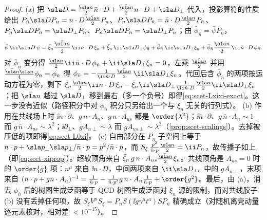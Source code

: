 \begin{proof}
(a) 把 $\sla D=\frac{\sla n}{2}\bar n\cdot D+\frac{\bar{\sla n}}{2}n\cdot D+\sla D_\perp$ 代入，投影算符的性质给出 $P_{\bar n}\sla DP_n=n\cdot D\frac{\bar{\sla n}}{2}P_n$、$P_n\sla DP_{\bar n}=\bar n\cdot D\frac{\sla n}{2}P_{\bar n}$、$P_{\bar n}\sla DP_{\bar n}=\sla D_\perp P_{\bar n}$、$P_n\sla DP_n=\sla D_\perp P_n$；由 $\bar\phi_{\bar n}=\bar\psi P_n$，
\begin{equation}\label{eq:scet-psiDpsi}
\bar\psi\,\ii\sla D\,\psi=\bar\xi_n\frac{\bar{\sla n}}{2}\,\ii n\cdot D\,\xi_n+\bar\xi_n\,\ii\sla D_\perp\phi_{\bar n}
+\bar\phi_{\bar n}\,\ii\sla D_\perp\xi_n+\bar\phi_{\bar n}\frac{\sla n}{2}\,\ii\bar n\cdot D\,\phi_{\bar n}.
\end{equation}
对 $\bar\phi_{\bar n}$ 变分得 $\frac{\sla n}{2}\ii\bar n\cdot D\,\phi_{\bar n}+\ii\sla D_\perp\xi_n=0$，左乘 $\frac{\bar{\sla n}}{2}$ 并用 $\frac{\bar{\sla n}\sla n}{4}\phi_{\bar n}=\phi_{\bar n}$ 得 $\phi_{\bar n}=-\frac{1}{\ii\bar n\cdot D}\frac{\bar{\sla n}}{2}\,\ii\sla D_\perp\xi_n$。代回后含 $\bar\phi_{\bar n}$ 的两项按运动方程为零，剩下 $\bar\xi_n\frac{\bar{\sla n}}2\ii n\cdot D\,\xi_n-\bar\xi_n\ii\sla D_\perp\frac{1}{\ii\bar n\cdot D}\frac{\bar{\sla n}}{2}\ii\sla D_\perp\xi_n$；把 $\bar{\sla n}$ 越过 $\sla D_\perp$ 移到最右（多一个负号）即得\cref{eq:scet-Lxixi-exact}。这一步没有近似（路径积分中对 $\phi_{\bar n}$ 积分只另给出一个与 $\xi_n$ 无关的行列式）。
(b) 作用在共线场上时 $\ii n\cdot\partial$、$g\,n\cdot A_n$、$g\,n\cdot A_{us}$ 都是 $\order{\lambda^2}$；$\ii\bar n\cdot\partial$、$g\,\bar n\cdot A_n\sim1$ 而 $g\,\bar n\cdot A_{us}\sim\lambda^2$；$\ii\partial_\perp$、$gA_{n\perp}\sim\lambda$ 而 $gA_{us\perp}\sim\lambda^2$（\cref{prop:scet-scalings}）。去掉被压低的项即得\cref{eq:scet-L0xi}。
(c) 自由部分在 $P_n$ 子空间上等于 $n\cdot p+\sla p_\perp\sla p_\perp/\bar n\cdot p=p^2/\bar n\cdot p$，而 $S_\xi\,\frac{p^2}{\bar n\cdot p}\frac{\bar{\sla n}}{2}=\ii P_n$，故传播子如上（即\cref{eq:scet-xiprop}）。超软顶角来自 $\bar\xi_n\,g\,n\cdot A_{us}\frac{\bar{\sla n}}2\xi_n$。共线顶角是 $A_{us}=0$ 时的 $\order{g}$ 项：$n^\mu$ 来自 $\ii n\cdot D$，中间两项来自 $\ii\sla D_{\perp c}$ 中的 $gA_{n\perp}$，末项来自 $(\bar n\cdot p+g\bar n\cdot A_n)^{-1}=\frac{1}{\bar n\cdot p}-\frac{1}{\bar n\cdot p'}g\,\bar n\cdot A_n\frac{1}{\bar n\cdot p}+\order{g^2}$。最后，由 (a)，消去 $\phi_{\bar n}$ 后的树图生成泛函等于 QCD 树图生成泛函对 $\xi_n$ 源的限制，而对共线胶子 (b) 没有丢掉任何项，故 $S_\xi V^\mu S_\xi=P_nS(\ii g\gamma^\mu t^a)SP_{\bar n}$ 精确成立（对随机离壳动量逐元素核对，相对差 $<10^{-15}$）。%
\end{proof}

